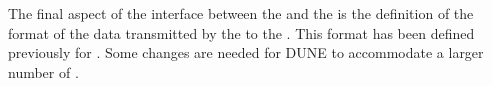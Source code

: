 The final aspect of the interface between the  and the  is
the definition of the format of the data transmitted by the 
to the .  This format has been defined previously for .
Some changes are needed for DUNE to accommodate a larger number of .

